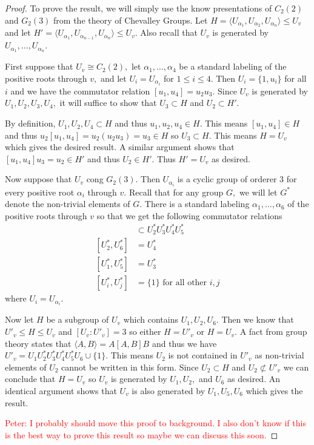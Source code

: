 \documentclass[class=book, crop=false]{standalone}
\begin{document}
\begin{proof}
	To prove the result, we will simply use the know presentations of $C_2(2)$ and $G_2(3)$ from the theory of Chevalley Groups. Let $H=\langle U_{\alpha_1},U_{\alpha_2},U_{\alpha_n}\rangle\le U_v$ and let $H'=\langle U_{\alpha_1},U_{\alpha_{n-1}},U_{\alpha_n}\rangle\le U_v.$ Also recall that $U_v$ is generated by $U_{\alpha_1},\dots,U_{\alpha_n}.$

	First suppose that $U_v\cong C_2(2),$ let $\alpha_1,\dots,\alpha_4$ be a standard labeling of the positive roots through $v,$ and let $U_i=U_{\alpha_i}$ for $1\le i \le 4.$ Then $U_i=\{1,u_i\}$ for all $i$ and we have the commutator relation $[u_1,u_4]=u_2u_3.$ Since $U_v$ is generated by $U_1,U_2,U_3,U_4,$ it will suffice to show that $U_3\subset H$ and $U_2\subset H'.$

	By definition, $U_1,U_2,U_4\subset H$ and thus $u_1,u_2,u_4\in H.$ This means $[u_1,u_4]\in H$ and thus $u_2[u_1,u_4]=u_2(u_2u_3)=u_3\in H$ so $U_3\subset H.$ This means $H=U_v$ which gives the desired result. A similar argument shows that $[u_1,u_4]u_3=u_2\in H'$ and thus $U_2\in H'.$ Thus $H'=U_v$ as desired.

	Now suppose that $U_v$ cong $G_2(3).$ Then $U_{\alpha_i}$ is a cyclic group of orderer 3 for every positive root $\alpha_i$ through $v.$ Recall that for any group $G,$ we will let $G^*$ denote the non-trivial elements of $G.$ There is a standard labeling $\alpha_1,\dots,\alpha_6$ of the positive roots through $v$ so that we get the following commutator relations
	\begin{align*}
		[U^*_1,U^*_6]&\subset U^*_2U^*_3U^*_4U^*_5\\
		[U^*_2,U^*_6]&=U^*_4\\
		[U^*_1,U^*_5]&=U^*_3\\
		[U^*_i,U^*_j]&=\{1\} \text{ for all other }i,j
	\end{align*}
	where $U_i=U_{\alpha_i}.$ 

	Now let $H$ be a subgroup of $U_v$ which contains $U_1,U_2,U_6.$ Then we know that $U'_v\le H\le U_v$ and $[U_v:U'_v]=3$ so either $H=U'_v$ or $H=U_v.$ A fact from group theory states that $\langle A,B\rangle=A[A,B]B$ and thus we have $U'_v=U_1U^*_2U^*_3U^*_4U^*_5U_6\cup\{1\}.$ This means $U_2$ is not contained in $U'_v$ as non-trivial elements of $U_2$ cannot be written in this form. Since $U_2\subset H$ and $U_2\not\subset U'_v$ we can conclude that $H=U_v$ so $U_v$ is generated by $U_1,U_2,$ and $U_6$ as desired. An identical argument shows that $U_v$ is also generated by $U_1,U_5,U_6$ which gives the result.

	\textcolor{red}{Peter: I probably should move this proof to background. I also don't know if this is the best way to prove this result so maybe we can discuss this soon.}
\end{proof}
\end{document}
